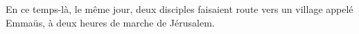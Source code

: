 En ce temps-là, le même jour,
	deux disciples faisaient route vers un village appelé Emmaüs,
	à deux heures de marche de Jérusalem.
